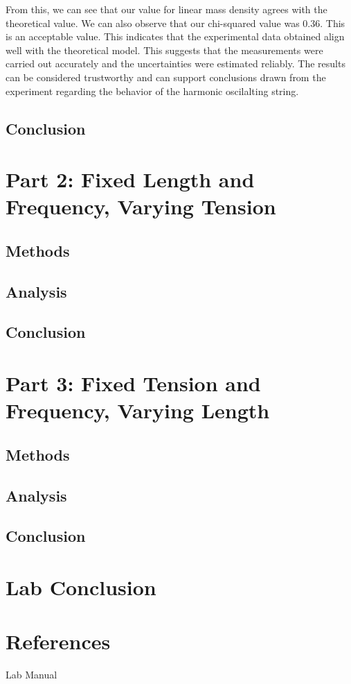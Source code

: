 \documentclass[11pt]{article}
\let\oldsection\section
\renewcommand\section{\clearpage\oldsection}
\begin{document}
    From this, we can see that our value for linear mass density agrees with the theoretical value. We can also observe that our chi-squared value was 0.36. This is an acceptable value. This indicates that the experimental data obtained align well with the theoretical model. This suggests that the measurements were carried out accurately and the uncertainties were estimated reliably. The results can be considered trustworthy and can support conclusions drawn from the experiment regarding the behavior of the harmonic oscilalting string. 



    \subsection{Conclusion}\label{subsec:part_1_conclusion}

    \section{Part 2: Fixed Length and Frequency, Varying Tension }\label{sec:part_2}
    \subsection{Methods}\label{subsec:part_2_methods}
    \subsection{Analysis}\label{subsec:part_2_analysis}
    \subsection{Conclusion}\label{subsec:part_2_conclusion}

    \section{Part 3: Fixed Tension and Frequency, Varying Length}\label{sec:part_3}
    \subsection{Methods}\label{subsec:part_3_methods}
    \subsection{Analysis}\label{subsec:part_3_analysis}
    \subsection{Conclusion}\label{subsec:part_3_conclusion}

    \section{Lab Conclusion}\label{sec:lab_conclusion}
    

    \appendix
    \section{References}\label{sec:references}

    Lab Manual
\end{document}
